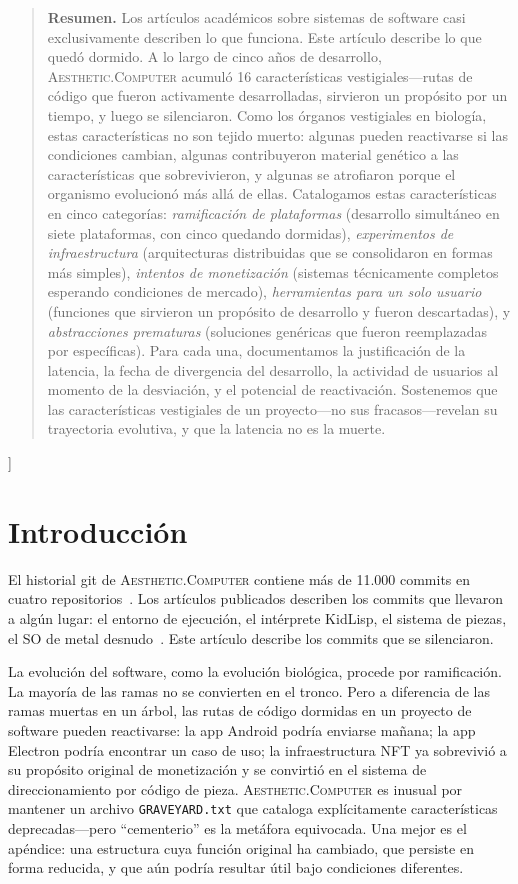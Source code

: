 \documentclass[10pt,letterpaper,twocolumn]{article}
\newcommand{\ac}{\textsc{Aesthetic.Computer}}
\begin{document}
{\begin{quote}
\small\noindent\textbf{Resumen.}
Los artículos académicos sobre sistemas de software casi exclusivamente describen lo que funciona. Este artículo describe lo que quedó dormido. A lo largo de cinco años de desarrollo, \ac{} acumuló 16 características vestigiales---rutas de código que fueron activamente desarrolladas, sirvieron un propósito por un tiempo, y luego se silenciaron. Como los órganos vestigiales en biología, estas características no son tejido muerto: algunas pueden reactivarse si las condiciones cambian, algunas contribuyeron material genético a las características que sobrevivieron, y algunas se atrofiaron porque el organismo evolucionó más allá de ellas. Catalogamos estas características en cinco categorías: \emph{ramificación de plataformas} (desarrollo simultáneo en siete plataformas, con cinco quedando dormidas), \emph{experimentos de infraestructura} (arquitecturas distribuidas que se consolidaron en formas más simples), \emph{intentos de monetización} (sistemas técnicamente completos esperando condiciones de mercado), \emph{herramientas para un solo usuario} (funciones que sirvieron un propósito de desarrollo y fueron descartadas), y \emph{abstracciones prematuras} (soluciones genéricas que fueron reemplazadas por específicas). Para cada una, documentamos la justificación de la latencia, la fecha de divergencia del desarrollo, la actividad de usuarios al momento de la desviación, y el potencial de reactivación. Sostenemos que las características vestigiales de un proyecto---no sus fracasos---revelan su trayectoria evolutiva, y que la latencia no es la muerte.
\end{quote}
\vspace{0.5em}
}]

\section{Introducción}

El historial git de \ac{} contiene más de 11.000 commits en cuatro repositorios~\citep{scudder2026archaeology}. Los artículos publicados describen los commits que llevaron a algún lugar: el entorno de ejecución, el intérprete KidLisp, el sistema de piezas, el SO de metal desnudo~\citep{scudder2026ac, scudder2026os}. Este artículo describe los commits que se silenciaron.

La evolución del software, como la evolución biológica, procede por ramificación. La mayoría de las ramas no se convierten en el tronco. Pero a diferencia de las ramas muertas en un árbol, las rutas de código dormidas en un proyecto de software pueden reactivarse: la app Android podría enviarse mañana; la app Electron podría encontrar un caso de uso; la infraestructura NFT ya sobrevivió a su propósito original de monetización y se convirtió en el sistema de direccionamiento por código de pieza. \ac{} es inusual por mantener un archivo \texttt{GRAVEYARD.txt} que cataloga explícitamente características deprecadas---pero ``cementerio'' es la metáfora equivocada. Una mejor es el apéndice: una estructura cuya función original ha cambiado, que persiste en forma reducida, y que aún podría resultar útil bajo condiciones diferentes.
\end{document}
